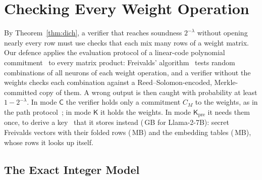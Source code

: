 \providecommand{\F}{\mathbb{F}_p}
\providecommand{\enc}{\mathrm{Enc}}
\providecommand{\T}{\top}
\providecommand{\sC}{\mathsf{C}}
\providecommand{\sK}{\mathsf{K}}
\providecommand{\Kpre}{\mathsf{K}_{\mathrm{pre}}}
\providecommand{\para}[1]{\par\noindent\textbf{#1}\quad}
\providecommand{\todo}[1]{\textbf{[TODO: #1]}}
\providecommand{\qed}{\hfill$\square$}
\makeatletter
{}
\makeatother

\section{Checking Every Weight Operation}
\label{sec:defence}

By Theorem~\ref{thm:dich}, a verifier that reaches soundness $2^{-\lambda}$ without opening nearly
every row must use checks that each mix many rows of a weight matrix. Our defence applies the
evaluation protocol of a linear-code polynomial commitment~\cite{ligero,brakedown} to every matrix
product: Freivalds' algorithm~\cite{freivalds1977} tests random combinations of all neurons of each
weight operation, and a verifier without the weights checks each combination against a
Reed--Solomon-encoded, Merkle-committed copy of them. A wrong output is then caught with
probability at least $1-2^{-\lambda}$. In mode $\sC$ the verifier holds
only a commitment $C_M$ to the weights, as in the path protocol~\cite{anchuri2026verifiable}; in mode $\sK$ it holds the weights. In mode $\Kpre$
it needs them once, to derive a key~\cite{slalom,commitllm2026} that it stores instead
(\KpreStoreGB{}\,GB for Llama-2-7B): secret Freivalds vectors with their folded rows
(\KpreKeyMB{}\,MB) and the embedding tables (\KpreEmbedMB{}\,MB), whose rows it looks up itself.

\subsection{The Exact Integer Model}
\label{sec:intmodel}

